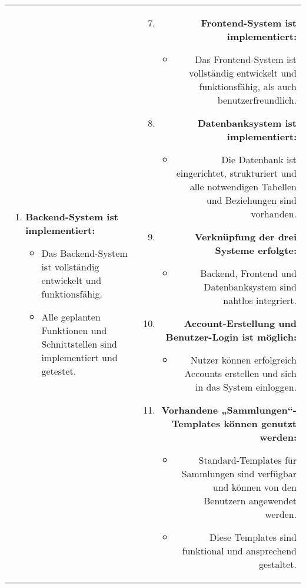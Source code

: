\begin{tabularx}{\textwidth}{L R}
\begin{enumerate}[left=0pt,label=\arabic*.]
            \item \textbf{Backend-System ist implementiert:}
            \begin{itemize}[label=--]
                \item Das Backend-System ist vollständig entwickelt und funktionsfähig.
                \item Alle geplanten Funktionen und Schnittstellen sind implementiert und getestet.
            \end{itemize}



        \end{enumerate}
        &
        \begin{enumerate}[left=0pt,label=\arabic*.]
            \setcounter{enumi}{6}
            \small
            \item \textbf{Frontend-System ist implementiert:}
            \begin{itemize}[label=--]
                \item Das Frontend-System ist vollständig entwickelt und funktionsfähig, als auch benutzerfreundlich.
            \end{itemize}
            \item \textbf{Datenbanksystem ist implementiert:}
            \begin{itemize}[label=--]
                \item Die Datenbank ist eingerichtet, strukturiert und alle notwendigen Tabellen und Beziehungen sind vorhanden.
            \end{itemize}

            \item \textbf{Verknüpfung der drei Systeme erfolgte:}
            \begin{itemize}[label=--]
                \item Backend, Frontend und Datenbanksystem sind nahtlos integriert.
            \end{itemize}

            \item \textbf{Account-Erstellung und Benutzer-Login ist möglich:}
            \begin{itemize}[label=--]
                \item Nutzer können erfolgreich Accounts erstellen und sich in das System einloggen.
            \end{itemize}

            \item \textbf{Vorhandene „Sammlungen“-Templates können genutzt werden:}
            \begin{itemize}[label=--]
                \item Standard-Templates für Sammlungen sind verfügbar und können von den Benutzern angewendet werden.
                \item Diese Templates sind funktional und ansprechend gestaltet.
            \end{itemize}


\end{enumerate}
\end{tabularx}
